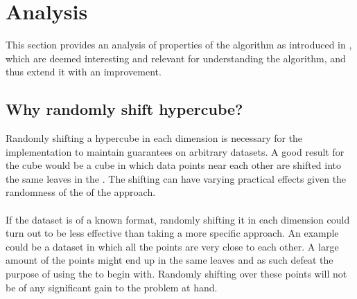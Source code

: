 \section{Analysis}
\label{analysis}
This section provides an analysis of properties of the \qs{} algorithm as introduced in \cite{wagner17}, which are deemed interesting and relevant for understanding the algorithm, and thus extend it with an improvement.


\subsection{Why randomly shift hypercube?}
Randomly shifting a hypercube in each dimension is necessary for the \qs{} implementation to maintain guarantees on arbitrary datasets. A good result for the cube would be a cube in which data points near each other are shifted into the same leaves in the \qt{}. The shifting can have varying practical effects given the randomness of the of the approach.
\\
\\
If the dataset is of a known format, randomly shifting it in each dimension could turn out to be less effective than taking a more specific approach. An example could be a dataset in which all the points are very close to each other. A large amount of the points might end up in the same leaves and as such defeat the purpose of using the \qt{} to begin with. Randomly shifting over these points will not be of any significant gain to the problem at hand.

